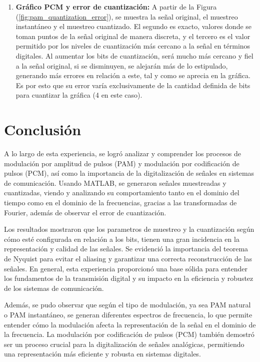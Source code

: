 \documentclass[12pt]{article}
\begin{document}
\begin{enumerate}
    \item \textbf{Gráfico PCM y error de cuantización:} A partir de la Figura (\ref{fig:pam_quantization_error}), se muestra la señal original, el muestreo instantáneo y el muestreo cuantizado. El segundo es exacto, valores donde se toman puntos de la señal original de manera discreta, y el tercero es el valor permitido por los niveles de cuantización más cercano a la señal en términos digitales. Al aumentar los bits de cuantización, será mucho más cercano y fiel a la señal original, si se disminuyen, se alejarán más de lo estipulado, generando más errores en relación a este, tal y como se aprecia en la gráfica. Es por esto que su error varía exclusivamente de la cantidad definida de bits para cuantizar la gráfica (4 en este caso).

\end{enumerate}

\section{Conclusión}

A lo largo de esta experiencia, se logró analizar y comprender los procesos de modulación por amplitud de pulsos (PAM) y modulación por codificación de pulsos (PCM), así como la importancia de la digitalización de señales en sistemas de comunicación. Usando MATLAB, se generaron señales muestreadas y cuantizadas, viendo y analizando su comportamiento tanto en el dominio del tiempo como en el dominio de la frecuencias, gracias a las transformadas de Fourier, además de observar el error de cuantización. 

Los resultados mostraron que los parametros de muestreo y la cuantización según cómo esté configurada en relación a los bits, tienen una gran incidencia en la representación y calidad de las señales. Se evidenció la importancia del teorema de Nyquist para evitar el aliasing y garantizar una correcta reconstrucción de las señales. En general, esta experiencia proporcionó una base sólida para entender los fundamentos de la transmisión digital y su impacto en la eficiencia y robustez de los sistemas de comunicación.

Además, se pudo observar que según el tipo de modulación, ya sea PAM natural o PAM instantáneo, se generan diferentes espectros de frecuencia, lo que permite entender cómo la modulación afecta la representación de la señal en el dominio de la frecuencia. La modulación por codificación de pulsos (PCM) también demostró ser un proceso crucial para la digitalización de señales analógicas, permitiendo una representación más eficiente y robusta en sistemas digitales.
\end{document}
